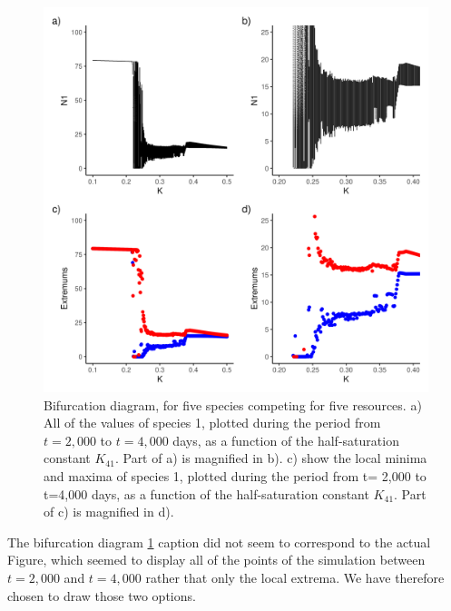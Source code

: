\begin{figure}[H]
\begin{center} 
 \includegraphics[width=1\textwidth]{../Code/Figures/Figure_3.png}
  \caption{Bifurcation diagram, for five species competing for five resources. a) All of the values of species 1, plotted during the period from $t=2,000$ to $t=4,000$ days, as a function of the half-saturation constant $K_{41}$. Part of a) is magnified in b). c) show the local minima and maxima of species 1, plotted during the period from t= 2,000 to t=4,000 days, as a function of the half-saturation constant $K_{41}$. Part of c) is magnified in d).}
  \label{figures:Fig3}
\end{center}
\end{figure}

The bifurcation diagram \ref{figures:Fig3} caption did not seem to correspond to the actual Figure, which seemed to display all of the points of the simulation between $t=2,000$ and $t=4,000$ rather that only the local extrema. We have therefore chosen to draw those two options. 

